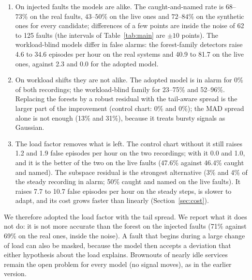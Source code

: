 \begin{enumerate}
\item On injected faults the models are alike. The caught-and-named rate is $68$--$73\%$ on the real faults, $43$--$50\%$ on the live ones and $72$--$84\%$ on the synthetic ones for every candidate; differences of a few points are inside the noise of 62 to 125 faults (the intervals of Table~\ref{tab:main} are $\pm 10$ points). The workload-blind models differ in false alarms: the forest-family detectors raise 4.6 to 34.6 episodes per hour on the real systems and 40.9 to 81.7 on the live ones, against 2.3 and 0.0 for the adopted model.
\item On workload shifts they are not alike. The adopted model is in alarm for 0\% of both recordings; the workload-blind family for 23--75\% and 52--96\%. Replacing the forests by a robust residual with the tail-aware spread is the larger part of the improvement (control chart: 0\% and 0\%); the MAD spread alone is not enough (13\% and 31\%), because it treats bursty signals as Gaussian.
\item The load factor removes what is left. The control chart without it still raises 1.2 and 1.9 false episodes per hour on the two recordings; with it 0.0 and 1.0, and it is the better of the two on the live faults (47.6\% against 46.4\% caught and named). The subspace residual is the strongest alternative (3\% and 4\% of the steady recording in alarm; 50\% caught and named on the live faults). It raises 7.7 to 10.7 false episodes per hour on the steady steps, is slower to adapt, and its cost grows faster than linearly (Section~\ref{sec:cost}).
\end{enumerate}
We therefore adopted the load factor with the tail spread. We report what it does not do: it is not more accurate than the forest on the injected faults (71\% against 69\% on the real ones, inside the noise). A fault that begins during a large change of load can also be masked, because the model then accepts a deviation that either hypothesis about the load explains. Brownouts of nearly idle services remain the open problem for every model (no signal moves), as in the earlier version.

